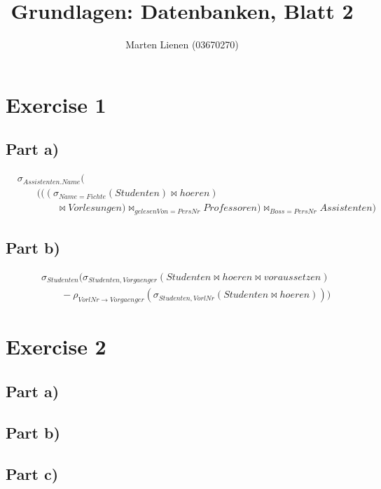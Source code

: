 \documentclass[10pt,a4paper]{article}
\title{Grundlagen: Datenbanken, Blatt 2}
\author{Marten Lienen (03670270)}
\begin{document}
\maketitle

\section*{Exercise 1}

\subsection*{Part a)}

\begin{align*}
  & \sigma_{Assistenten.Name}(\\
  & \qquad (((\sigma_{Name=Fichte}(Studenten) \bowtie hoeren)\\
  & \qquad \qquad \bowtie Vorlesungen) \bowtie_{gelesenVon=PersNr} Professoren) \bowtie_{Boss=PersNr} Assistenten)
\end{align*}

\subsection*{Part b)}

\begin{align*}
  & \sigma_{Studenten}(\sigma_{Studenten,Vorgaenger}(Studenten \bowtie hoeren \bowtie voraussetzen)\\
  & \qquad - \rho_{VorlNr \rightarrow Vorgaenger}(\sigma_{Studenten,VorlNr}(Studenten \bowtie hoeren)))
\end{align*}

\section*{Exercise 2}

\subsection*{Part a)}

\subsection*{Part b)}

\subsection*{Part c)}
\end{document}
